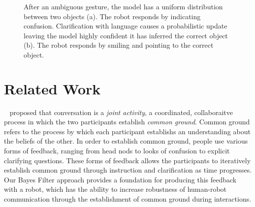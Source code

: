 \documentclass[a4paper, 11pt]{article} %
\begin{document}
\begin{figure}
\centering
{}
\caption{After an ambiguous gesture, the model has a uniform
  distribution between two objects (a).  The robot responds by
  indicating confusion.  Clarification with language causes a
  probabilistic update leaving the model highly confident it has
  inferred the correct object (b).  The robot responds by smiling and
  pointing to the correct object. \label{fig:cartoon}}
\end{figure}

\section{Related Work}
~\citep{clark96} proposed that conversation is a \textit{joint activity}, a coordinated, collaboraitve process in which the two participants establish \textit{common ground}. Common ground refers to the process by which each participant establishs an understanding about the beliefs of the other. In order to establish common ground, people use various forms of feedback, ranging from head nods to looks of confusion to explicit clarifying questions. These forms of feedback allows the participants to iteratively establish common ground through instruction and clarification as time progresses. Our Bayes Filter approach provides a foundation for producing this feedback with a robot, which has the ability to increase robustness of human-robot communication through the establishment of common ground during interactions.
\end{document}
